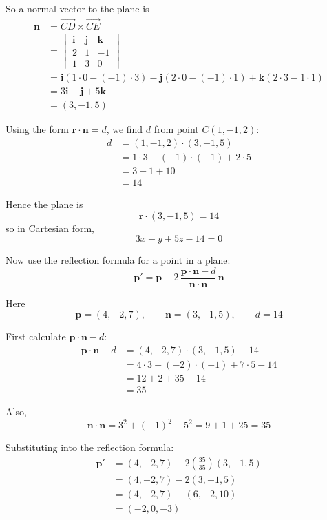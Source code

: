 \documentclass[leqno]{article}
\begin{document}
\begin{enumerate}[
  label=\textbf{\arabic*.},
  leftmargin=*,
  topsep=0pt,
  partopsep=0pt,
  parsep=0pt
]
\begin{tcolorbox}[colback=white, colframe=scarlet, title={\textbf{Solution}}, breakable, grow to left by=6mm, grow to right by=10mm]
So a normal vector to the plane is
\begin{align*}
\mathbf n
&=\overrightarrow{CD}\times\overrightarrow{CE}\\
&=
\begin{vmatrix}
\mathbf i & \mathbf j & \mathbf k\\
2 & 1 & -1\\
1 & 3 & 0
\end{vmatrix}\\
&=\mathbf i(1\cdot 0-(-1)\cdot 3)-\mathbf j(2\cdot 0-(-1)\cdot 1)+\mathbf k(2\cdot 3-1\cdot 1)\\
&=3\mathbf i-\mathbf j+5\mathbf k\\
&=(3,-1,5)
\end{align*}

Using the form \(\mathbf r\cdot\mathbf n=d\), we find \(d\) from point \(C(1,-1,2)\):
\begin{align*}
d&=(1,-1,2)\cdot(3,-1,5)\\
&=1\cdot 3+(-1)\cdot(-1)+2\cdot 5\\
&=3+1+10\\
&=14
\end{align*}

Hence the plane is
\[
\mathbf r\cdot(3,-1,5)=14
\]
so in Cartesian form,
\[
3x-y+5z-14=0
\]

Now use the reflection formula for a point in a plane:
\[
\mathbf p'
=\mathbf p
-2\,\frac{\mathbf p\cdot\mathbf n-d}{\mathbf n\cdot\mathbf n}\,\mathbf n
\]

Here
\[
\mathbf p=(4,-2,7),\qquad \mathbf n=(3,-1,5),\qquad d=14
\]

First calculate \(\mathbf p\cdot\mathbf n-d\):
\begin{align*}
\mathbf p\cdot\mathbf n-d
&=(4,-2,7)\cdot(3,-1,5)-14\\
&=4\cdot 3+(-2)\cdot(-1)+7\cdot 5-14\\
&=12+2+35-14\\
&=35
\end{align*}

Also,
\[
\mathbf n\cdot\mathbf n=3^2+(-1)^2+5^2=9+1+25=35
\]

Substituting into the reflection formula:
\begin{align*}
\mathbf p'
&=(4,-2,7)-2\left(\frac{35}{35}\right)(3,-1,5)\\
&=(4,-2,7)-2(3,-1,5)\\
&=(4,-2,7)-(6,-2,10)\\
&=(-2,0,-3)
\end{align*}


\end{tcolorbox}
\end{enumerate}
\end{document}
